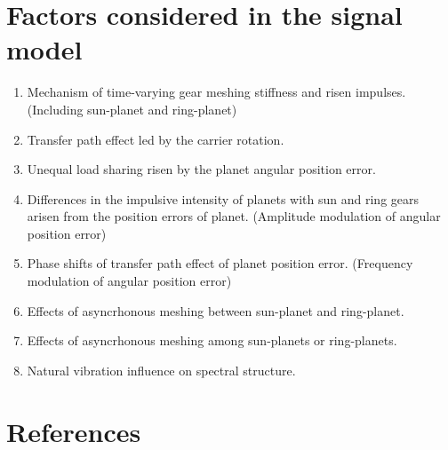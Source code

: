 \documentclass[a4paper,fleqn]{cas-sc}
\begin{document}
\section{Factors considered in the signal model}
\begin{enumerate}
    \item Mechanism of time-varying gear meshing stiffness and risen impulses. (Including sun-planet and ring-planet)
    \item Transfer path effect led by the carrier rotation.
    \item Unequal load sharing risen by the planet angular position error.
    \item Differences in the impulsive intensity of planets with sun and ring gears arisen from the position errors of planet. (Amplitude modulation of angular position error)
    \item Phase shifts of transfer path effect of planet position error. (Frequency modulation of angular position error)
    \item Effects of asyncrhonous meshing between sun-planet and ring-planet.
    \item Effects of asyncrhonous meshing among sun-planets or ring-planets.
    \item Natural vibration influence on spectral structure.
\end{enumerate}
\section*{References}


\end{document}
